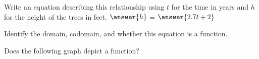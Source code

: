 \documentclass{ximera}
\begin{document}
\begin{problem}
\begin{problem}
\begin{problem}
            \begin{problem}
                Write an equation describing this relationship using $t$ for the time in years and $h$ for the height of the trees in feet. $\answer{h}$ = $\answer{2.7t+2}$

                \begin{problem}
                    Identify the domain, codomain, and whether this equation is a function.
                    \begin{multipleChoice}
                    \end{multipleChoice}
                \end{problem}
            \end{problem}
        \end{problem}
    \end{problem}
\end{problem}

\begin{problem}
    Does the following graph depict a function?
\begin{center}
\end{center}

    \begin{multipleChoice}
    \end{multipleChoice}
\end{problem}
\end{document}
